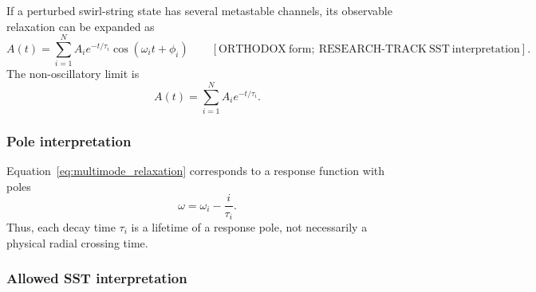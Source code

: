         If a perturbed swirl-string state has several metastable channels, its observable relaxation can be expanded as
        \begin{equation}
            \boxed{
                A(t)
                =
                \sum_{i=1}^{N}
                A_i
                e^{-t/\tau_i}
                \cos(\omega_i t+\phi_i)
            }
            \qquad
            [\mathrm{ORTHODOX\ form;\ RESEARCH\text{-}TRACK\ SST\ interpretation}].
            \label{eq:multimode_relaxation}
        \end{equation}
        The non-oscillatory limit is
        \begin{equation}
            A(t)
            =
            \sum_{i=1}^{N}
            A_i e^{-t/\tau_i}.
            \label{eq:multigroup_decay}
        \end{equation}
    
    \subsubsection*{Pole interpretation}
        
        Equation~\eqref{eq:multimode_relaxation} corresponds to a response function with poles
        \begin{equation}
            \omega
            =
            \omega_i
            -
            \frac{i}{\tau_i}.
            \label{eq:response_poles}
        \end{equation}
        Thus, each decay time \(\tau_i\) is a lifetime of a response pole, not necessarily a physical radial crossing time.
    
    \subsubsection*{Allowed SST interpretation}
        
